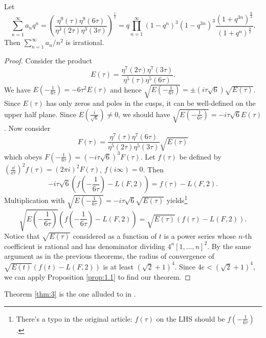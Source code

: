 \begin{theorem}
    \label{thm:3}
    Let
    $$
        \sum_{n=1}^{\infty} a_n q^n = \left(\frac{\eta^9(\tau) \eta^9 (6\tau)}{\eta^3(2\tau) \eta^3(3 \tau)}\right)^{\frac{1}{2}} = q \prod_{n=1}^{\infty} (1 - q^n)^{3} (1 - q^{3n})^{3} \frac{(1 + q^{3n})^{\frac{9}{2}}}{(1 + q^{n})^{\frac{3}{2}}}.
    $$
    Then $\sum_{n=1}^{\infty} a_n / n^{2}$ is irrational.
\end{theorem}

\begin{proof}
    Consider the product
    $$
        E(\tau) = \frac{\eta^7(2\tau) \eta^7(3 \tau)}{\eta^5(\tau) \eta^5(6\tau)}.
    $$
    We have $E(-\frac{1}{6\tau}) = -6 \tau^2 E(\tau)$ and hence $\sqrt{E(-\frac{1}{6\tau})} = \pm (i \tau \sqrt{6}) \sqrt{E(\tau)}$.
    Since $E(\tau)$ has only zeros and poles in the cusps, it can be well-defined on the upper half plane.
    Since $E(\frac{i}{\sqrt{6}}) \ne 0$, we should have $\sqrt{E(-\frac{1}{6\tau})} = -i \tau \sqrt{6} E(\tau)$. Now consider
    $$
        F(\tau) = \frac{\eta^7(\tau) \eta^7(6\tau)}{\eta^5(2\tau) \eta^5(3\tau)} \sqrt{E(\tau)}
    $$
    which obeys $F(-\frac{1}{6\tau}) = (-i\tau \sqrt{6})^{3} F(\tau)$.
    Let $f(\tau)$ be defined by $(\frac{\dd}{\dd \tau})^{2} f(\tau) = (2 \pi i)^2 F(\tau)$, $f(i\infty) = 0$.
    Then
    $$
        -i\tau \sqrt{6} \left(f\left(-\frac{1}{6\tau}\right) - L(F, 2)\right) = f(\tau) - L(F, 2).
    $$
    Multiplication with $\sqrt{E(-\frac{1}{6\tau})} = -i\tau \sqrt{6} \sqrt{E(\tau)}$ yields\footnote{There's a typo in the original article: $f(\tau)$ on the LHS should be $f(-\frac{1}{6\tau})$.}
    $$
        \sqrt{E\left(-\frac{1}{6 \tau}\right)} \left(f\left(-\frac{1}{6\tau}\right) - L(F, 2)\right) = \sqrt{E(\tau)} (f(\tau) - L(F, 2)).
    $$
    Notice that $\sqrt{E(\tau)}$ considered as a function of $t$ is a power series whose $n$-th coefficient is rational and has denominator dividing $4^n [1, \dots, n]^2$.
    By the same argument as in the previous theorems, the radius of convergence of $\sqrt{E(t)} (f(t) - L(F, 2))$ is at least $(\sqrt{2} + 1)^4$.
    Since $4 e < (\sqrt{2} + 1)^{4}$, we can apply Proposition \ref{prop:1.1} to find our theorem.
\end{proof}

\begin{remark*}
    Theorem \ref{thm:3} is the one alluded to in \cite{beukers1982irrationality}.
\end{remark*}
